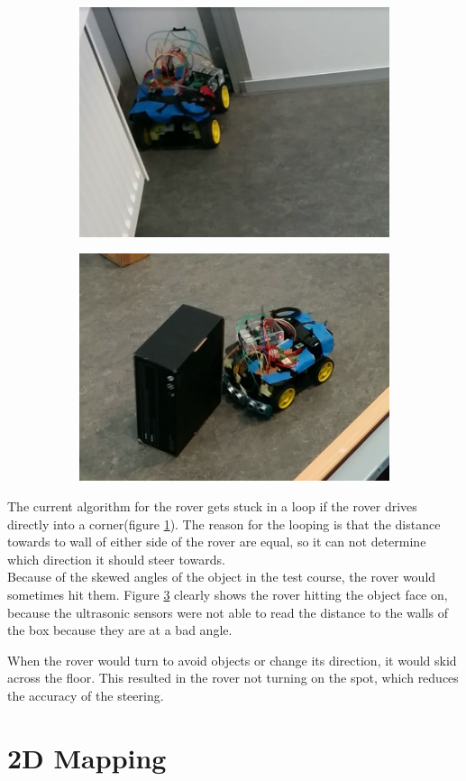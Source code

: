 \begin{figure}[H]
	\centering
	\begin{subfigure}[H]{0.4\textwidth}
		\includegraphics[width=\textwidth]{images/test-stuckincorner.jpg}
		\label{corner}
	\end{subfigure}%
	\quad
	\begin{subfigure}[H]{0.4\textwidth}
		\includegraphics[width=\textwidth]{images/test-badmeasuringangle.jpg}
		\label{badangle}
	\end{subfigure}
\end{figure}

The current algorithm for the rover gets stuck in a loop if the rover drives directly into a corner(figure \ref{corner}). The reason for the looping is that the distance towards to wall of either side of the rover are equal, so it can not determine which direction it should steer towards.\\
Because of the skewed angles of the object in the test course, the rover would sometimes hit them. Figure \ref{badangle} clearly shows the rover hitting the object face on, because the ultrasonic sensors were not able to read the distance to the walls of the box because they are at a bad angle.

When the rover would turn to avoid objects or change its direction, it would skid across the floor. This resulted in the rover not turning on the spot, which reduces the accuracy of the steering.

\clearpage
\section{2D Mapping}